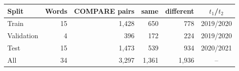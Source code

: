 \begin{tabular}{lrrrrc}
\toprule
Split & Words & COMPARE pairs & same & different & $t_1$/$t_2$ \\
\midrule
Train & 15 & 1{,}428 & 650 & 778 & 2019/2020 \\
Validation & 4 & 396 & 172 & 224 & 2019/2020 \\
Test & 15 & 1{,}473 & 539 & 934 & 2020/2021 \\
\midrule
All & 34 & 3{,}297 & 1{,}361 & 1{,}936 & -- \\
\bottomrule
\end{tabular}